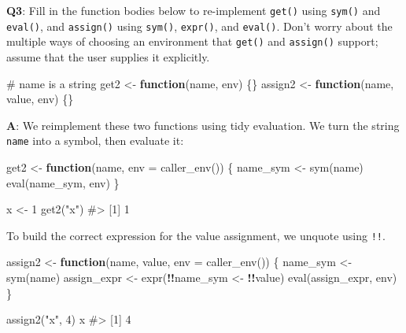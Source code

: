 \documentclass[
]{krantz}
\makeatletter
\newenvironment{Shaded}{\begin{snugshade}}{\end{snugshade}}
\newcommand{\CommentTok}[1]{\textcolor[rgb]{0.56,0.35,0.01}{\textit{#1}}}
\newcommand{\ControlFlowTok}[1]{\textcolor[rgb]{0.13,0.29,0.53}{\textbf{#1}}}
\newcommand{\DataTypeTok}[1]{\textcolor[rgb]{0.13,0.29,0.53}{#1}}
\newcommand{\DecValTok}[1]{\textcolor[rgb]{0.00,0.00,0.81}{#1}}
\newcommand{\KeywordTok}[1]{\textcolor[rgb]{0.13,0.29,0.53}{\textbf{#1}}}
\newcommand{\NormalTok}[1]{#1}
\newcommand{\OperatorTok}[1]{\textcolor[rgb]{0.81,0.36,0.00}{\textbf{#1}}}
\newcommand{\StringTok}[1]{\textcolor[rgb]{0.31,0.60,0.02}{#1}}
\newenvironment{kframe}{%
\medskip{}
\setlength{\fboxsep}{.8em}
 \def\at@end@of@kframe{}%
 \ifinner\ifhmode%
  \def\at@end@of@kframe{\end{minipage}}%
  \begin{minipage}{\columnwidth}%
 \fi\fi%
 \def\FrameCommand##1{\hskip\@totalleftmargin \hskip-\fboxsep
 \colorbox{shadecolor}{##1}\hskip-\fboxsep
     \hskip-\linewidth \hskip-\@totalleftmargin \hskip\columnwidth}%
 \MakeFramed {\advance\hsize-\width
   \@totalleftmargin\z@ \linewidth\hsize
   \@setminipage}}%
 {\par\unskip\endMakeFramed%
 \at@end@of@kframe}
\renewenvironment{Shaded}{\begin{kframe}}{\end{kframe}}
\renewcommand{\KeywordTok} [1]{\textcolor[rgb]{0.00,0.44,0.13}{{#1}}}
\renewcommand{\DataTypeTok}[1]{\textcolor[rgb]{0.56,0.13,0.00}{{#1}}}
\renewcommand{\DecValTok}  [1]{\textcolor[rgb]{0.25,0.63,0.44}{{#1}}}
\renewcommand{\StringTok}  [1]{\textcolor[rgb]{0.25,0.44,0.63}{{#1}}}
\renewcommand{\CommentTok} [1]{\textcolor[rgb]{0.38,0.63,0.69}{{#1}}}
\renewcommand{\NormalTok}  [1]{{#1}}
\makeatother
\begin{document}
\textbf{{Q3}}: Fill in the function bodies below to re-implement \texttt{get()} using \texttt{sym()} and \texttt{eval()}, and \texttt{assign()} using \texttt{sym()}, \texttt{expr()}, and \texttt{eval()}. Don't worry about the multiple ways of choosing an environment that \texttt{get()} and \texttt{assign()} support; assume that the user supplies it explicitly.

\begin{Shaded}
\begin{Highlighting}[]
\CommentTok{# name is a string}
\NormalTok{get2 <-}\StringTok{ }\ControlFlowTok{function}\NormalTok{(name, env) \{\}}
\NormalTok{assign2 <-}\StringTok{ }\ControlFlowTok{function}\NormalTok{(name, value, env) \{\}}
\end{Highlighting}
\end{Shaded}

\textbf{{A}}: We reimplement these two functions using tidy evaluation. We turn the string \texttt{name} into a symbol, then evaluate it:

\begin{Shaded}
\begin{Highlighting}[]
\NormalTok{get2 <-}\StringTok{ }\ControlFlowTok{function}\NormalTok{(name, }\DataTypeTok{env =} \KeywordTok{caller_env}\NormalTok{()) \{}
\NormalTok{  name_sym <-}\StringTok{ }\KeywordTok{sym}\NormalTok{(name)}
  \KeywordTok{eval}\NormalTok{(name_sym, env)}
\NormalTok{\}}

\NormalTok{x <-}\StringTok{ }\DecValTok{1}
\KeywordTok{get2}\NormalTok{(}\StringTok{"x"}\NormalTok{)}
\CommentTok{#> [1] 1}
\end{Highlighting}
\end{Shaded}

To build the correct expression for the value assignment, we unquote using \texttt{!!}.

\begin{Shaded}
\begin{Highlighting}[]
\NormalTok{assign2 <-}\StringTok{ }\ControlFlowTok{function}\NormalTok{(name, value, }\DataTypeTok{env =} \KeywordTok{caller_env}\NormalTok{()) \{}
\NormalTok{  name_sym <-}\StringTok{ }\KeywordTok{sym}\NormalTok{(name)}
\NormalTok{  assign_expr <-}\StringTok{ }\KeywordTok{expr}\NormalTok{(}\OperatorTok{!!}\NormalTok{name_sym <-}\StringTok{ }\OperatorTok{!!}\NormalTok{value)}
  \KeywordTok{eval}\NormalTok{(assign_expr, env)}
\NormalTok{\}}

\KeywordTok{assign2}\NormalTok{(}\StringTok{"x"}\NormalTok{, }\DecValTok{4}\NormalTok{)}
\NormalTok{x}
\CommentTok{#> [1] 4}
\end{Highlighting}
\end{Shaded}
\end{document}
